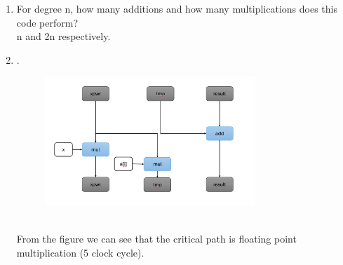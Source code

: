 \documentclass{article}
\begin{document}
\begin{enumerate}[label=\textbf{\Alph*.}]
	\item For degree n, how many additions and how many multiplications does this
	code perform? \\
	n and 2n respectively.
	\item . \\
	\begin{figure}[h]
		\centering
		\includegraphics[width=0.75\textwidth]{fig1}
	\end{figure} \\
	From the figure we can see that the critical path is floating point multiplication
	(5 clock cycle).
\end{enumerate}
\end{document}
